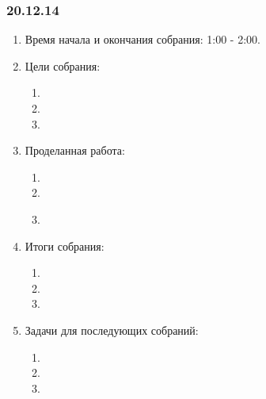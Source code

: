 ﻿\subsubsection{20.12.14}
\begin{enumerate}
	
	\item Время начала и окончания собрания: 1:00 - 2:00.
	
	\item Цели собрания: 
	\begin{enumerate}
		
		\item 
		
		\item 
		
                \item 
		
	\end{enumerate}

	\item Проделанная работа:
	\begin{enumerate}
		
		\item 
		
		\item 
		
                \item 
		
                \begin{figure}[H]
	  	    \begin{minipage}[h]{0.2\linewidth}
	  		\center  
	  	    \end{minipage}
	  	    \begin{minipage}[h]{0.6\linewidth}
	  		\caption{}
	  	    \end{minipage}
	       \end{figure}

	\end{enumerate}
	
	\item Итоги собрания:
	\begin{enumerate}
		
		\item 
		
		\item 
		
                \item 
		
	\end{enumerate}
	
	\item Задачи для последующих собраний:
	\begin{enumerate}
		
		\item 
		
		\item 
		
                \item 
			
	\end{enumerate}
\end{enumerate}
\fillpage
